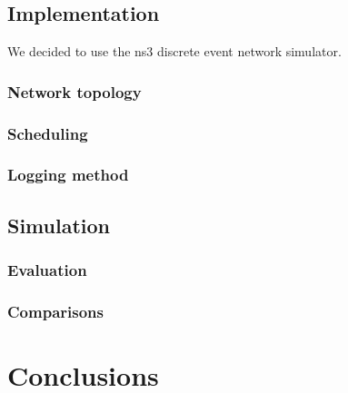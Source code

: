 \documentclass{article}
\begin{document}
\subsection{Implementation}
We decided to use the ns3 discrete event network simulator.


\subsubsection{Network topology}

\subsubsection{Scheduling}

\subsubsection{Logging method}

\subsection{Simulation}

\subsubsection{Evaluation}

\subsubsection{Comparisons}

\section{Conclusions}
\end{document}
